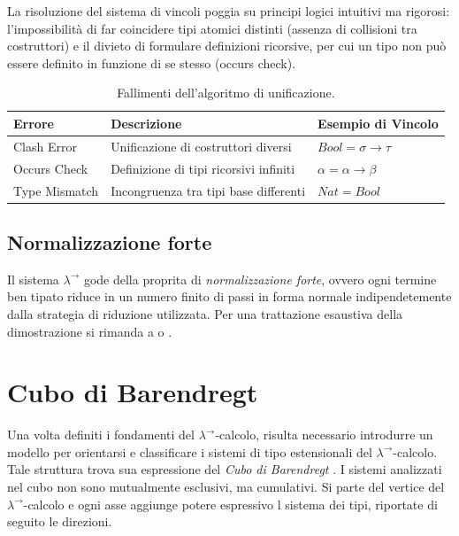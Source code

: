 La risoluzione del sistema di vincoli poggia su principi logici intuitivi ma rigorosi: 
l'impossibilità di far coincidere tipi atomici distinti (assenza di collisioni tra costruttori) e 
il divieto di formulare definizioni ricorsive, per cui un tipo non può essere definito in funzione di se stesso (occurs check).
\begin{table}[h]
    \centering \small
    \begin{tabular}{lp{5cm}l}
        \hline
        \textbf{Errore} & \textbf{Descrizione}                   & \textbf{Esempio di Vincolo}  \\ \hline
        Clash Error     & Unificazione di costruttori diversi    & $Bool = \sigma \to \tau$     \\
        Occurs Check    & Definizione di tipi ricorsivi infiniti & $\alpha = \alpha \to \beta$  \\
        Type Mismatch   & Incongruenza tra tipi base differenti  & $Nat = Bool$                 \\ \hline
    \end{tabular}
    \caption{Fallimenti dell'algoritmo di unificazione.}
    \label{tab:unification_failures}
\end{table}

\subsection{Normalizzazione forte}
Il sistema $\lambda^{\to}$ gode della proprita di \emph{normalizzazione forte}, ovvero ogni termine ben tipato riduce in un numero finito di passi
in forma normale indipendetemente dalla strategia di riduzione utilizzata. Per una trattazione esaustiva della dimostrazione si rimanda a \cite{Girard1989} o
\cite{Hindley1997}.

\section{Cubo di Barendregt}
Una volta definiti i fondamenti del $\lambda^{\to}$-calcolo, risulta necessario introdurre un modello per orientarsi e classificare
i sistemi di tipo estensionali del $\lambda^{\to}$-calcolo. Tale struttura trova sua espressione del \emph{Cubo di Barendregt} \cite{barendregt1992}.
I sistemi analizzati nel cubo non sono mutualmente esclusivi, ma cumulativi. Si parte del vertice del $\lambda^{\to}$-calcolo e ogni
asse aggiunge potere espressivo l sistema dei tipi, riportate di seguito le direzioni.

